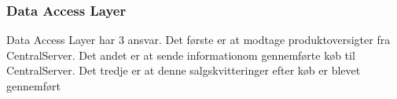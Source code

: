\subsubsection{Data Access Layer}
Data Access Layer har 3 ansvar. Det første er at modtage produktoversigter fra CentralServer. Det andet er at sende informationom gennemførte køb til CentralServer. Det tredje er at denne salgskvitteringer efter køb er blevet gennemført
